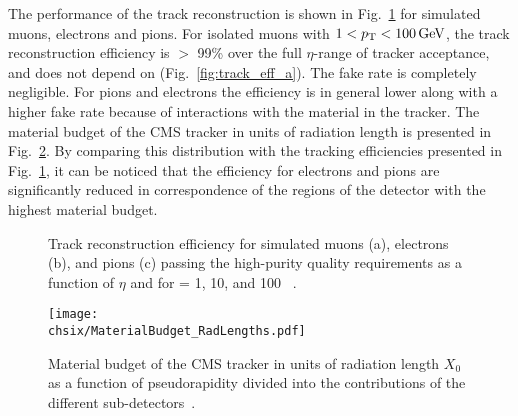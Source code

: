 The performance of the track reconstruction is shown in Fig.~\ref{fig:track_eff} for simulated muons, electrons and pions.
For isolated muons with $1 < p_{\mathrm{T}} < 100\,\text{Ge\hspace{-.08em}V}$, the track reconstruction efficiency is $>$ 99\% over the full $\eta$-range of tracker acceptance, and does not depend on \pt (Fig.~\ref{fig:track_eff_a}). The fake rate is completely negligible. For pions and electrons the efficiency is in general lower along with a higher fake rate because of interactions with the material in the tracker. The material budget of the CMS tracker in units of radiation length is presented in Fig.~\ref{fig:budgetCMStracker}. By comparing this distribution with the tracking efficiencies presented in Fig.~\ref{fig:track_eff}, it can be noticed that the efficiency for electrons and pions are significantly reduced in correspondence of the regions of the detector with the highest material budget.

\begin{figure}[!htb]
\centering
{}
\caption{Track reconstruction efficiency for simulated muons (a), electrons (b), and pions (c) passing the high-purity quality requirements as a function of $\eta$ and for \pt = 1, 10, and 100 \GeV~\cite{Chatrchyan:2014fea}.}
\label{fig:track_eff}
\end{figure}

\begin{figure}[!htb]
 \begin{center}
  \texttt{[image: \\chsix/MaterialBudget\_RadLengths.pdf]}
 \end{center}
 \caption{Material budget of the CMS tracker in units of radiation length $X_0$ as a function of pseudorapidity divided into the contributions of the different sub-detectors~\cite{Chatrchyan:2014fea}.}
 \label{fig:budgetCMStracker}
\end{figure}

